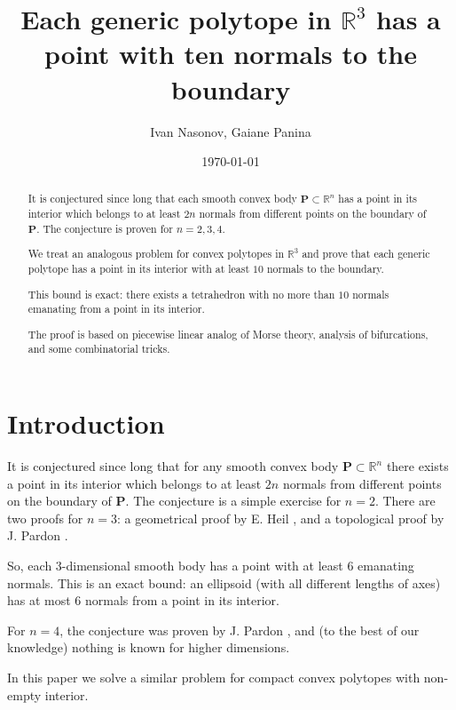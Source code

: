 \documentclass[12pt]{amsart}
\title[Each polytope in $\mathbb{R}^3$ has a point with ten normals]{Each  generic polytope in $\mathbb{R}^3$ has a point with ten normals to the boundary }
\author{Ivan Nasonov, Gaiane Panina}
\date{\today}
\newtheorem*{main lemma}{The main lemma}
\begin{document}
\begin{abstract}It is conjectured since long that each smooth convex body $\mathbf{P}\subset \mathbb{R}^n$ has a point in its interior   which belongs to at least $2n$ normals from different points on the boundary of $\mathbf{P}$. The conjecture is proven for $n=2,3,4$.

We treat an analogous problem for convex polytopes in $\mathbb{R}^3$  and prove that each generic  polytope  has a point in its interior with at least $10$ normals to the boundary.  

This  bound is exact: there exists a tetrahedron with no more than $10$ normals emanating from a point in its interior.

The proof is based on piecewise linear analog of Morse theory, analysis of bifurcations, and some combinatorial tricks.
\end{abstract}

\maketitle



\section{Introduction}



\medskip





It is conjectured since long that for any smooth convex body $\mathbf{P}\subset \mathbb{R}^n$ there exists a point in its interior   which belongs to at least $2n$ normals from different points on the boundary of $\mathbf{P}$. The conjecture is a simple exercise for $n=2$. There are two proofs for  $n=3$:  a geometrical proof by E. Heil \cite{Heil},  and a topological proof by J. Pardon \cite{Pardon}. 

So, each $3$-dimensional smooth body has a point with at least $6$ emanating normals. This is an exact bound: an ellipsoid (with all different lengths of axes) has at most $6$ normals from a point in its interior.

 For   $n=4$, the conjecture was proven by J. Pardon \cite{Pardon}, and (to the best of our knowledge) nothing is known for higher dimensions.

In this paper we solve a similar problem for  compact convex polytopes with non-empty interior. 
\end{document}
